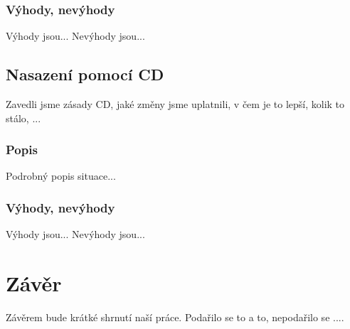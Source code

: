 \subsection{Výhody, nevýhody}
Výhody jsou...
Nevýhody jsou...

\section{Nasazení pomocí CD}
Zavedli jsme zásady CD, jaké změny jsme uplatnili, v čem je to lepší, kolik to stálo, ...

\subsection{Popis}
Podrobný popis situace...

\subsection{Výhody, nevýhody}
Výhody jsou...
Nevýhody jsou...


\chapter{Závěr}
\label{ch:zaver}
Závěrem bude krátké shrnutí naší práce. Podařilo se to a to, nepodařilo se ....

